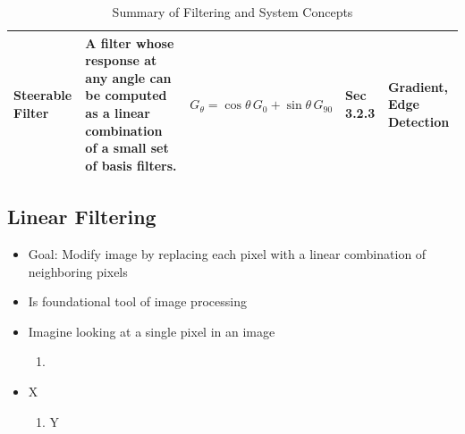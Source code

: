 \documentclass[12pt]{article}
\begin{document}
\begin{table}[h!]
\begin{tabular}{|p{2.8cm}|p{4.2cm}|p{3cm}|p{2cm}|p{2.5cm}|}
        Steerable Filter
                      & A filter whose response at any angle can be computed as a linear combination of a small set of basis filters.
                      & $G_{\theta} = \cos\theta \, G_{0} + \sin\theta \, G_{90}$
                      & Sec 3.2.3
                      & Gradient, Edge Detection                                                                                                                                                                                                               \\
        \hline
    \end{tabular}
    \caption{Summary of Filtering and System Concepts}
\end{table}


\subsection{Linear Filtering}
\begin{itemize}
    \item Goal: Modify image by replacing each pixel with a linear combination of neighboring pixels
    \item Is foundational tool of image processing
    \item Imagine looking at a single pixel in an image
          \begin{enumerate}
              \item
          \end{enumerate}
\end{itemize}






\begin{itemize}
    \item X
          \begin{enumerate}
              \item Y
          \end{enumerate}
\end{itemize}
\end{document}
